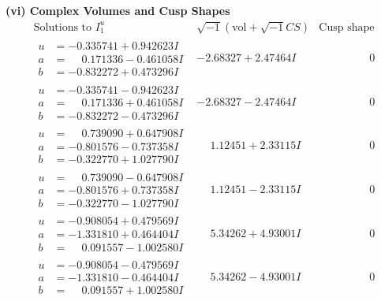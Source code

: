 \documentclass[1p]{elsarticle_modified}
\theoremstyle{definition}
\newcommand{\I}{\sqrt{-1}}
\begin{document}
\newpage\flushleft \textbf{(vi) Complex Volumes and Cusp Shapes}
$$\begin{array}{c|c|c}  
\text{Solutions to }I^u_{1}& \I (\text{vol} + \sqrt{-1}CS) & \text{Cusp shape}\\
 \hline 
\begin{aligned}
u &= -0.335741 + 0.942623 I \\
a &= \phantom{-}0.171336 - 0.461058 I \\
b &= -0.832272 + 0.473296 I\end{aligned}
 & -2.68327 + 2.47464 I & \phantom{-0.000000 } 0 \\ \hline\begin{aligned}
u &= -0.335741 - 0.942623 I \\
a &= \phantom{-}0.171336 + 0.461058 I \\
b &= -0.832272 - 0.473296 I\end{aligned}
 & -2.68327 - 2.47464 I & \phantom{-0.000000 } 0 \\ \hline\begin{aligned}
u &= \phantom{-}0.739090 + 0.647908 I \\
a &= -0.801576 - 0.737358 I \\
b &= -0.322770 + 1.027790 I\end{aligned}
 & \phantom{-}1.12451 + 2.33115 I & \phantom{-0.000000 } 0 \\ \hline\begin{aligned}
u &= \phantom{-}0.739090 - 0.647908 I \\
a &= -0.801576 + 0.737358 I \\
b &= -0.322770 - 1.027790 I\end{aligned}
 & \phantom{-}1.12451 - 2.33115 I & \phantom{-0.000000 } 0 \\ \hline\begin{aligned}
u &= -0.908054 + 0.479569 I \\
a &= -1.331810 + 0.464404 I \\
b &= \phantom{-}0.091557 - 1.002580 I\end{aligned}
 & \phantom{-}5.34262 + 4.93001 I & \phantom{-0.000000 } 0 \\ \hline\begin{aligned}
u &= -0.908054 - 0.479569 I \\
a &= -1.331810 - 0.464404 I \\
b &= \phantom{-}0.091557 + 1.002580 I\end{aligned}
 & \phantom{-}5.34262 - 4.93001 I & \phantom{-0.000000 } 0 \\ \hline\begin{aligned}

\end{aligned}
\end{array}$$
\end{document}
